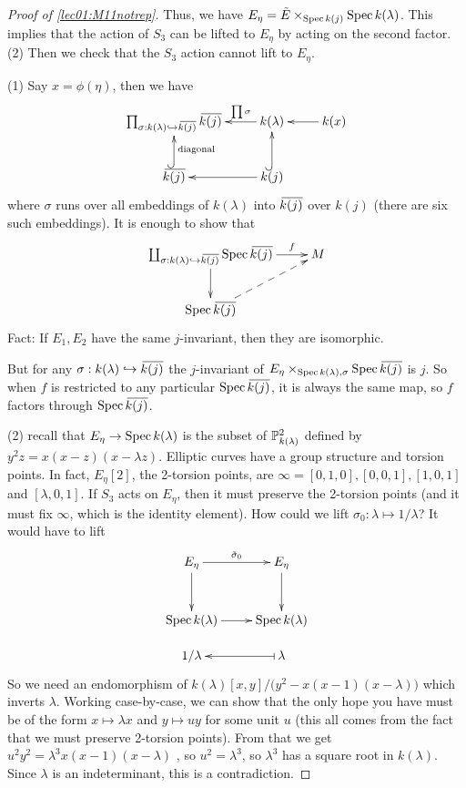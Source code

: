 \begin{proof}[Proof of \ref{lec01:M11notrep}]
  Thus, we have $E_\eta = \tilde E\times_{\operatorname{Spec} k(j)} \operatorname{Spec} k(\lambda)$. This implies
  that the action of $S_3$ can be lifted to $E_\eta$ by acting on the second factor.\\
  (2) Then we check that the $S_3$ action cannot lift to $E_\eta$.

  (1) Say $x=\phi(\eta)$, then we have
  \[\xymatrix{
  \prod_{\sigma:k(\lambda)\hookrightarrow \bbar{k(j)}} \bbar{k(j)} & k(\lambda) \ar[l]_<>(.5){\prod \sigma} & k(x)\ar[l] \\
  \bbar{k(j)} \ar@{^(->}[u]_{\text{diagonal}}& k(j) \ar@{^(->}[u] \ar[l] &
  }\]
   where $\sigma$ runs over all embeddings of $k(\lambda)$ into $\bbar{k(j)}$ over
  $k(j)$ (there are six such embeddings). It is enough to show that
  \[\xymatrix{
   \coprod_{\sigma:k(\lambda)\hookrightarrow \bbar{k(j)}} \spec\bbar{k(j)} \ar[r]^<>(.5)f \ar[d] & M\\
   \spec \bbar{k(j)} \ar@{-->}[ur]
  }\]
    Fact: If $E_1,E_2$ have the same
  $j$-invariant, then they are isomorphic.

  But for any $\sigma:k(\lambda)\hookrightarrow \bbar{k(j)}$ the $j$-invariant of
  $E_\eta \times_{\spec k(\lambda), \sigma} \spec \bbar{k(j)}$ is $j$.  So when $f$ is restricted to any particular $\spec \bbar{k(j)}$, it is always the
  same map, so $f$ factors through $\spec \bbar{k(j)}$.

  (2) recall that $E_\eta\to \operatorname{Spec} k(\lambda)$ is the subset of $\mathbb{P}^2_{k(\lambda)}$
  defined by $y^2z=x(x-z)(x-\lambda z)$. Elliptic curves have a group structure and
  torsion points. In fact, $E_\eta[2]$, the 2-torsion points, are $\infty=[0,1,0],
  [0,0,1], [1,0,1]$ and $[\lambda,0,1]$. If $S_3$ acts on $E_\eta$, then it must
  preserve the 2-torsion points (and it must fix $\infty$, which is the identity
  element). How could we lift $\sigma_0:\lambda\mapsto 1/\lambda$? It would have to lift
  \[\xymatrix @R-1pc{
   E_\eta \ar[r]^{\tilde \sigma_0}  \ar[dd] & E_\eta \ar[dd]\\ \\
   \spec k(\lambda) \ar[r] & \spec k(\lambda)\\
   1/\lambda & \lambda \ar@{|->}[l]
  }\]
   So we need an endomorphism of $k(\lambda)[x,y]/\bigl(y^2-x(x-1)(x-\lambda)\bigr)$
  which inverts $\lambda$. Working case-by-case, we can show that the only hope you have
  must be of the form $x\mapsto \lambda x$ and $y\mapsto uy$ for some unit $u$ (this all
  comes from the fact that we must preserve 2-torsion points). From that we get
  $u^2y^2=\lambda^3 x(x-1)(x-\lambda)$ , so $u^2=\lambda^3$, so
  $\lambda^3$ has a square root in $k(\lambda)$. Since $\lambda$ is an indeterminant,
  this is a contradiction.
\end{proof}

